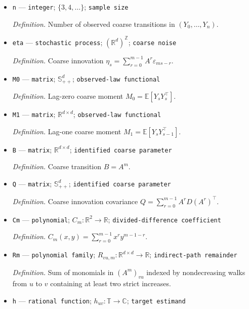 \documentclass{article}
\begin{document}
\begin{itemize}
  \par\smallskip\noindent\emph{Definition.} Observed coarse process \(Y_s=X_{ms}\).
  \item \texttt{n} --- \texttt{integer}; \(\{3,4,\ldots\}\); \texttt{sample size}
  \par\smallskip\noindent\emph{Definition.} Number of observed coarse transitions in \((Y_0,\ldots,Y_n)\).
  \item \texttt{eta} --- \texttt{stochastic process}; \((\mathbb R^d)^{\mathbb Z}\); \texttt{coarse noise}
  \par\smallskip\noindent\emph{Definition.} Coarse innovation \(\eta_s=\sum_{r=0}^{m-1}A^r\varepsilon_{ms-r}\).
  \item \texttt{M0} --- \texttt{matrix}; \(\mathbb S_{++}^{d}\); \texttt{observed-\allowbreak{}law functional}
  \par\smallskip\noindent\emph{Definition.} Lag-zero coarse moment \(M_0=\mathbb E[Y_sY_s^\top]\).
  \item \texttt{M1} --- \texttt{matrix}; \(\mathbb R^{d\times d}\); \texttt{observed-\allowbreak{}law functional}
  \par\smallskip\noindent\emph{Definition.} Lag-one coarse moment \(M_1=\mathbb E[Y_sY_{s-1}^\top]\).
  \item \texttt{B} --- \texttt{matrix}; \(\mathbb R^{d\times d}\); \texttt{identified coarse parameter}
  \par\smallskip\noindent\emph{Definition.} Coarse transition \(B=A^m\).
  \item \texttt{Q} --- \texttt{matrix}; \(\mathbb S_{++}^{d}\); \texttt{identified coarse parameter}
  \par\smallskip\noindent\emph{Definition.} Coarse innovation covariance \(Q=\sum_{r=0}^{m-1}A^rD(A^r)^\top\).
  \item \texttt{Cm} --- \texttt{polynomial}; \(C_m:\mathbb R^2\to\mathbb R\); \texttt{divided-\allowbreak{}difference coefficient}
  \par\smallskip\noindent\emph{Definition.} \(C_m(x,y)=\sum_{r=0}^{m-1}x^r y^{m-1-r}\).
  \item \texttt{Rm} --- \texttt{polynomial family}; \(R_{vu,m}:\mathbb R^{d\times d}\to\mathbb R\); \texttt{indirect-\allowbreak{}path remainder}
  \par\smallskip\noindent\emph{Definition.} Sum of monomials in \((A^m)_{vu}\) indexed by nondecreasing walks from \(u\) to \(v\) containing at least two strict increases.
  \item \texttt{h} --- \texttt{rational function}; \(h_{uv}:\mathbb T\to\mathbb C\); \texttt{target estimand}

\end{itemize}
\end{document}
